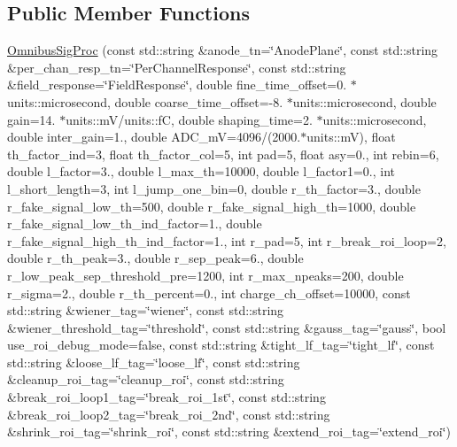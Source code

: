 \subsection*{Public Member Functions}
\begin{DoxyCompactItemize}
\item 
\hyperlink{class_wire_cell_1_1_sig_proc_1_1_omnibus_sig_proc_a1e1e84074c812a083b5b0433e708f377}{Omnibus\+Sig\+Proc} (const std\+::string \&anode\+\_\+tn=\char`\"{}Anode\+Plane\char`\"{}, const std\+::string \&per\+\_\+chan\+\_\+resp\+\_\+tn=\char`\"{}Per\+Channel\+Response\char`\"{}, const std\+::string \&field\+\_\+response=\char`\"{}Field\+Response\char`\"{}, double fine\+\_\+time\+\_\+offset=0. $\ast$units\+::microsecond, double coarse\+\_\+time\+\_\+offset=-\/8. $\ast$units\+::microsecond, double gain=14. $\ast$units\+::mV/units\+::fC, double shaping\+\_\+time=2. $\ast$units\+::microsecond, double inter\+\_\+gain=1., double A\+D\+C\+\_\+mV=4096/(2000.$\ast$units\+::mV), float th\+\_\+factor\+\_\+ind=3, float th\+\_\+factor\+\_\+col=5, int pad=5, float asy=0., int rebin=6, double l\+\_\+factor=3., double l\+\_\+max\+\_\+th=10000, double l\+\_\+factor1=0., int l\+\_\+short\+\_\+length=3, int l\+\_\+jump\+\_\+one\+\_\+bin=0, double r\+\_\+th\+\_\+factor=3., double r\+\_\+fake\+\_\+signal\+\_\+low\+\_\+th=500, double r\+\_\+fake\+\_\+signal\+\_\+high\+\_\+th=1000, double r\+\_\+fake\+\_\+signal\+\_\+low\+\_\+th\+\_\+ind\+\_\+factor=1., double r\+\_\+fake\+\_\+signal\+\_\+high\+\_\+th\+\_\+ind\+\_\+factor=1., int r\+\_\+pad=5, int r\+\_\+break\+\_\+roi\+\_\+loop=2, double r\+\_\+th\+\_\+peak=3., double r\+\_\+sep\+\_\+peak=6., double r\+\_\+low\+\_\+peak\+\_\+sep\+\_\+threshold\+\_\+pre=1200, int r\+\_\+max\+\_\+npeaks=200, double r\+\_\+sigma=2., double r\+\_\+th\+\_\+percent=0., int charge\+\_\+ch\+\_\+offset=10000, const std\+::string \&wiener\+\_\+tag=\char`\"{}wiener\char`\"{}, const std\+::string \&wiener\+\_\+threshold\+\_\+tag=\char`\"{}threshold\char`\"{}, const std\+::string \&gauss\+\_\+tag=\char`\"{}gauss\char`\"{}, bool use\+\_\+roi\+\_\+debug\+\_\+mode=false, const std\+::string \&tight\+\_\+lf\+\_\+tag=\char`\"{}tight\+\_\+lf\char`\"{}, const std\+::string \&loose\+\_\+lf\+\_\+tag=\char`\"{}loose\+\_\+lf\char`\"{}, const std\+::string \&cleanup\+\_\+roi\+\_\+tag=\char`\"{}cleanup\+\_\+roi\char`\"{}, const std\+::string \&break\+\_\+roi\+\_\+loop1\+\_\+tag=\char`\"{}break\+\_\+roi\+\_\+1st\char`\"{}, const std\+::string \&break\+\_\+roi\+\_\+loop2\+\_\+tag=\char`\"{}break\+\_\+roi\+\_\+2nd\char`\"{}, const std\+::string \&shrink\+\_\+roi\+\_\+tag=\char`\"{}shrink\+\_\+roi\char`\"{}, const std\+::string \&extend\+\_\+roi\+\_\+tag=\char`\"{}extend\+\_\+roi\char`\"{})

\end{DoxyCompactItemize}
